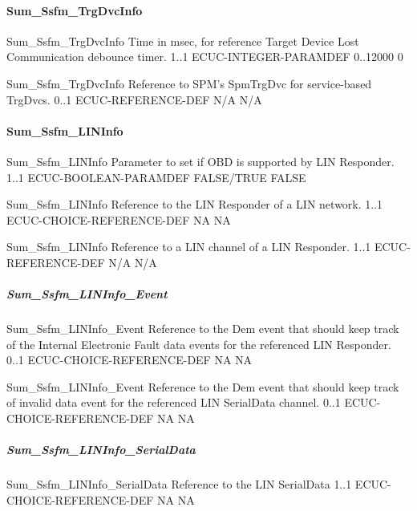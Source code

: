 \paragraph{Sum_Ssfm_TrgDvcInfo}

{Sum_Ssfm_TrgDvcInfo}
{Time in msec, for reference Target Device Lost Communication debounce timer.}
{1..1}
{ECUC-INTEGER-PARAMDEF}
{0..12000}
{0}

{Sum_Ssfm_TrgDvcInfo}
{Reference to SPM's SpmTrgDvc for service-based TrgDvcs.}
{0..1}
{ECUC-REFERENCE-DEF}
{N/A}
{N/A}


\paragraph{Sum_Ssfm_LINInfo}


{Sum_Ssfm_LINInfo}
{Parameter to set if OBD is supported by LIN Responder.}
{1..1}
{ECUC-BOOLEAN-PARAMDEF}
{FALSE/TRUE}
{FALSE}

{Sum_Ssfm_LINInfo}
{Reference to the LIN Responder of a LIN network.}
{1..1}
{ECUC-CHOICE-REFERENCE-DEF}
{NA}
{NA}

{Sum_Ssfm_LINInfo}
{Reference to a LIN channel of a LIN Responder.}
{1..1}
{ECUC-REFERENCE-DEF}
{N/A}
{N/A}

\subparagraph{Sum_Ssfm_LINInfo_Event}

{Sum_Ssfm_LINInfo_Event}
{Reference to the Dem event that should keep track of the Internal Electronic Fault data events for the referenced LIN Responder.}
{0..1}
{ECUC-CHOICE-REFERENCE-DEF}
{NA}
{NA}

{Sum_Ssfm_LINInfo_Event}
{Reference to the Dem event that should keep track of invalid data event for the referenced LIN SerialData channel.}
{0..1}
{ECUC-CHOICE-REFERENCE-DEF}
{NA}
{NA}

\subparagraph{Sum_Ssfm_LINInfo_SerialData}

{Sum_Ssfm_LINInfo_SerialData}
{Reference to the LIN SerialData}
{1..1}
{ECUC-CHOICE-REFERENCE-DEF}
{NA}
{NA}

{  }

